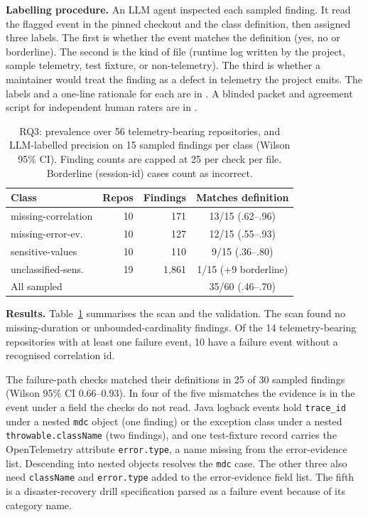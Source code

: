 \documentclass[conference]{IEEEtran}
\begin{document}
\textbf{Labelling procedure.} An LLM agent inspected each sampled finding. It read the flagged event in the pinned checkout and the class definition, then assigned three labels. The first is whether the event matches the definition (yes, no or borderline). The second is the kind of file (runtime log written by the project, sample telemetry, test fixture, or non-telemetry). The third is whether a maintainer would treat the finding as a defect in telemetry the project emits. The labels and a one-line rationale for each are in . A blinded packet and agreement script for independent human raters are in .

\begin{table}[t]
\caption{RQ3: prevalence over 56 telemetry-bearing repositories, and LLM-labelled precision on 15 sampled findings per class (Wilson 95\% CI). Finding counts are capped at 25 per check per file. Borderline (session-id) cases count as incorrect.}
\label{tab:rq3}
\centering
\footnotesize\setlength{\tabcolsep}{3pt}
\begin{tabular}{lrrc}
\toprule
Class & Repos & Findings & Matches definition \\
\midrule
missing-correlation & 10 & 171 & 13/15 (.62--.96) \\
missing-error-ev. & 10 & 127 & 12/15 (.55--.93) \\
sensitive-values & 10 & 110 & 9/15 (.36--.80) \\
unclassified-sens. & 19 & 1,861 & 1/15 (+9 borderline) \\
\midrule
All sampled & & & 35/60 (.46--.70) \\
\bottomrule
\end{tabular}
\end{table}

\textbf{Results.} Table~\ref{tab:rq3} summarises the scan and the validation. The scan found no missing-duration or unbounded-cardinality findings. Of the 14 telemetry-bearing repositories with at least one failure event, 10 have a failure event without a recognised correlation id.

The failure-path checks matched their definitions in 25 of 30 sampled findings (Wilson 95\% CI 0.66--0.93). In four of the five mismatches the evidence is in the event under a field the checks do not read. Java logback events hold \texttt{trace\_id} under a nested \texttt{mdc} object (one finding) or the exception class under a nested \texttt{throwable.className} (two findings), and one test-fixture record carries the OpenTelemetry attribute \texttt{error.type}, a name missing from the error-evidence list. Descending into nested objects resolves the \texttt{mdc} case. The other three also need \texttt{className} and \texttt{error.type} added to the error-evidence field list. The fifth is a disaster-recovery drill specification parsed as a failure event because of its category name.
\end{document}
